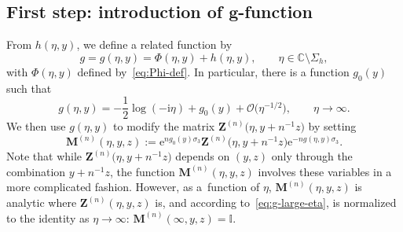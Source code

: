 \subsection[First step: introduction of g-function]{First step: introduction of $\boldsymbol{g}$-function}
From $h(\eta,y)$, we define a related function by
\begin{equation*}
g=g(\eta,y)=\Phi(\eta,y)+h(\eta,y),\qquad \eta\in\mathbb{C}\setminus\Sigma_h,
\end{equation*}
with $\Phi(\eta,y)$ defined by~\eqref{eq:Phi-def}. In particular,
there is a function $g_0(y)$ such that
\begin{equation}
g(\eta,y)=-\frac{1}{2}\log(-\mathrm{i}\eta) + g_0(y)+\mathcal{O}\bigl(\eta^{-1/2}\bigr),\qquad\eta\to\infty.
\label{eq:g-large-eta}
\end{equation}
We then use $g(\eta,y)$ to modify the matrix $\mathbf{Z}^{(n)}\bigl(\eta,y+n^{-1}z\bigr)$ by setting
\begin{equation}
\mathbf{M}^{(n)}(\eta,y,z):=\mathrm{e}^{ng_0(y)\sigma_3}\mathbf{Z}^{(n)}\bigl(\eta,y+n^{-1}z\bigr)\mathrm{e}^{-ng(\eta,y)\sigma_3}.
\label{eq:MZ}
\end{equation}
Note that while $\mathbf{Z}^{(n)}\bigl(\eta,y+n^{-1}z\bigr)$ depends on $(y,z)$ only through the
combination $y+n^{-1}z$, the function $\mathbf{M}^{(n)}(\eta,y,z)$ involves these
variables in a more complicated fashion. However, as a~function of $\eta$,
$\mathbf{M}^{(n)}(\eta,y,z)$ is analytic where $\mathbf{Z}^{(n)}(\eta,y,z)$ is, and
according to~\eqref{eq:g-large-eta}, is normalized to the identity as
$\eta\to\infty$: $\mathbf{M}^{(n)}(\infty,y,z)=\mathbb{I}$.

